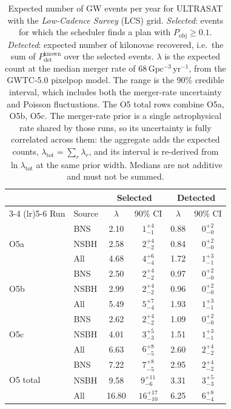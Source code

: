 \begin{table}[!htb]
\centering
\renewcommand\arraystretch{1.15}
\setlength{\tabcolsep}{0.22cm}
\caption{Expected number of GW events per year for ULTRASAT with the \emph{Low-Cadence Survey} (LCS) grid. \emph{Selected}: events for which the scheduler finds a plan with $P_\mathrm{obj} \geq 0.1$. \emph{Detected}: expected number of kilonovae recovered, i.e.\ the sum of $P_\mathrm{det}^\mathrm{known}$ over the selected events. $\lambda$ is the expected count at the median merger rate of 68\,$\mathrm{Gpc^{-3}\,yr^{-1}}$, from the GWTC-5.0 pixelpop model. The range is the 90\% credible interval, which includes both the merger-rate uncertainty and Poisson fluctuations. The O5 total rows combine O5a, O5b, O5c. The merger-rate prior is a single astrophysical rate shared by those runs, so its uncertainty is fully correlated across them: the aggregate adds the expected counts, $\lambda_\mathrm{tot} = \sum_r \lambda_r$, and its interval is re-derived from $\ln \lambda_\mathrm{tot}$ at the same prior width. Medians are not additive and must not be summed.}
\label{tab:ultrasat-non-overlap-selected-detected-1yr}
\begin{tabular}{llcccc}
\toprule
 & & \multicolumn{2}{c}{Selected} & \multicolumn{2}{c}{Detected} \\
\cmidrule(lr){3-4} \cmidrule(lr){5-6}
Run & Source & $\lambda$ & 90\% CI & $\lambda$ & 90\% CI \\
\midrule
\multirow{3}{*}{O5a} & BNS  & 2.10 & $1^{+4}_{-1}$ & 0.88 & $0^{+2}_{-0}$ \\
                     & NSBH & 2.58 & $2^{+4}_{-2}$ & 0.84 & $0^{+2}_{-0}$ \\
                     & All  & 4.68 & $4^{+6}_{-4}$ & 1.72 & $1^{+3}_{-1}$ \\
\midrule
\multirow{3}{*}{O5b} & BNS  & 2.50 & $2^{+4}_{-2}$ & 0.97 & $0^{+2}_{-0}$ \\
                     & NSBH & 2.99 & $2^{+4}_{-2}$ & 0.96 & $0^{+2}_{-0}$ \\
                     & All  & 5.49 & $5^{+7}_{-4}$ & 1.93 & $1^{+3}_{-1}$ \\
\midrule
\multirow{3}{*}{O5c} & BNS  & 2.62 & $2^{+4}_{-2}$ & 1.09 & $0^{+2}_{-0}$ \\
                     & NSBH & 4.01 & $3^{+5}_{-3}$ & 1.51 & $1^{+3}_{-1}$ \\
                     & All  & 6.63 & $6^{+8}_{-5}$ & 2.60 & $2^{+4}_{-2}$ \\
\midrule
\multirow{3}{*}{O5 total} & BNS  & 7.22 & $7^{+8}_{-5}$ & 2.95 & $2^{+4}_{-2}$ \\
                          & NSBH & 9.58 & $9^{+11}_{-6}$ & 3.31 & $3^{+5}_{-3}$ \\
                          & All  & 16.80 & $16^{+17}_{-10}$ & 6.25 & $6^{+8}_{-4}$ \\
\bottomrule
\end{tabular}
\end{table}
